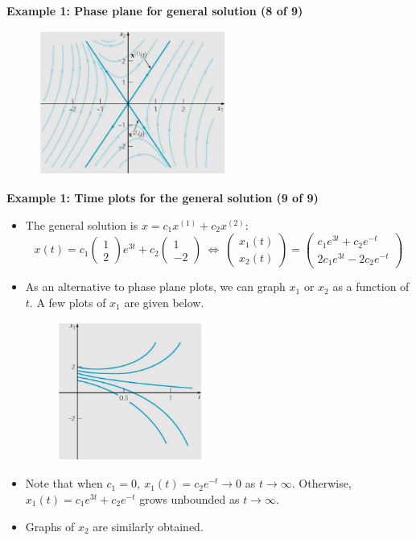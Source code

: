 \documentclass[11pt,a4paper]{article}
\begin{document}
	\textbf{Example 1: Phase plane for general solution (8 of 9)}
	\begin{figure}[H]
		\centering
			\includegraphics[width=0.55\textwidth]{figure/Lec12f2.PNG}
	\end{figure}
	\textbf{Example 1: Time plots for the general solution (9 of 9)}
	\begin{itemize}
		\item The general solution is $x = c_1x^{(1)} + c_2x^{(2)}$: 
		$$
		x(t) = c_1
		\begin{pmatrix}
			1\\
			2
		\end{pmatrix}e^{3t} + c_2
		\begin{pmatrix}
			1\\
			-2
		\end{pmatrix}\ \Leftrightarrow\ 
		\begin{pmatrix}
			x_1(t)\\
			x_2(t)
		\end{pmatrix}=
		\begin{pmatrix}
			c_1e^{3t} + c_2e^{-t}\\
			2c_1e^{3t} - 2c_2e^{-t}
		\end{pmatrix}
		$$
		\item As an alternative to phase plane plots, we can graph $x_1$ or $x_2$ as a function of $t$. A few plots of $x_1$ are given below. 
		\begin{figure}[H]
			\centering
				\includegraphics[width=0.45\textwidth]{figure/Lec12f3.PNG}
		\end{figure}
		\item Note that when $c_1 = 0,\ x_1(t) = c_2e^{-t}\to 0$ as $t \to \infty$. Otherwise, $x_1(t) = c_1e^{3t} + c_2e^{-t}$ grows unbounded as $t \to \infty$.
		\item Graphs of $x_2$ are similarly obtained.
	\end{itemize}
\end{document}
